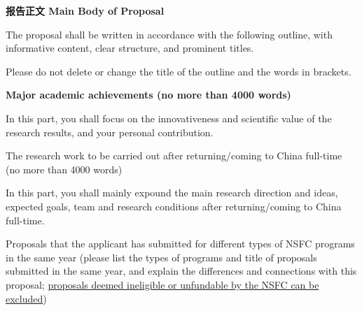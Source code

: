 \documentclass[14pt,UTF8,AutoFakeBold=3,a4paper]{ctexart}
\newcommand{\blue}[1]{{\color{NsfcBlue}#1}}
\begin{document}
\fontsize{14pt}{14pt}\selectfont
\setlength{\parindent}{1.5em}

\begin{center}
{\bfseries \Large 报告正文 Main Body of Proposal}
\end{center}
\vskip 5mm

\NsfcSubHeader{\textcolor{black}{参照以下提纲撰写，要求内容翔实、清晰，层次分明，标题突出。}}

The proposal shall be written in accordance with the following outline, with informative content, clear structure, and prominent titles.


\blue{Please do not delete or change the title of the outline and the words in brackets.}


\blue{\bfseries Major academic achievements (no more than 4000 words)}


\blue{In this part, you shall focus on the innovativeness and scientific value of the research results, and your personal contribution.}

\vspace{0.8cm}

\blue{The research work to be carried out after returning/coming to China full-time (no more than 4000 words)}


\blue{In this part, you shall mainly expound the main research direction and ideas, expected goals, team and research conditions after returning/coming to China full-time.}







\blue{Proposals that the applicant has submitted for different types of NSFC programs in the same year (please list the types of programs and title of proposals submitted in the same year, and explain the differences and connections with this proposal;
\uline{proposals deemed ineligible or unfundable by the NSFC can be excluded})}
\end{document}

